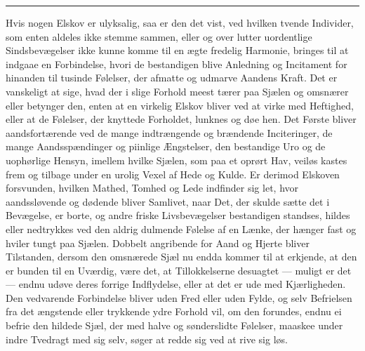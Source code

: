 \documentclass[12pt,a4paper]{book}
\newcommand{\apage}[1]{\marginnote{\footnotesize\textit{[#1]}}}
\begin{document}
\begin{center}\rule{0.28\linewidth}{0.4pt}\end{center}

Hvis nogen Elskov er ulyksalig, saa er den det vist, ved hvilken tvende
Individer, som enten aldeles ikke stemme sammen, eller og over lutter
uordentlige Sindsbevægelser ikke kunne komme til en ægte fredelig
Harmonie, bringes til at indgaae en Forbindelse, hvori de bestandigen
blive Anledning og Incitament for hinanden til tusinde Følelser, der
afmatte og udmarve Aandens Kraft. Det er vanskeligt at sige, hvad der i
slige Forhold meest tærer paa Sjælen og omsnærer eller betynger den,
enten at en virkelig Elskov bliver ved at virke med Heftighed, eller at
de Følelser, der knyttede Forholdet, lunknes og døe hen. Det Første
bliver aandsfortærende ved de mange indtrængende og brændende
Inciteringer, de mange Aandsspændinger og piinlige Ængstelser, den
bestandige Uro og de uophørlige Hensyn, imellem hvilke Sjælen, som paa
et oprørt \apage{133} Hav, veiløs kastes frem og tilbage under en urolig Vexel af
Hede og Kulde. Er derimod Elskoven forsvunden, hvilken Mathed, Tomhed og
Lede indfinder sig let, hvor aandssløvende og dødende bliver Samlivet,
naar Det, der skulde sætte det i Bevægelse, er borte, og andre friske
Livsbevægelser bestandigen standses, hildes eller nedtrykkes ved den
aldrig dulmende Følelse af en Lænke, der hænger fast og hviler tungt paa
Sjælen. Dobbelt angribende for Aand og Hjerte bliver Tilstanden, dersom
den omsnærede Sjæl nu endda kommer til at erkjende, at den er bunden til
en Uværdig, være det, at Tillokkelserne desuagtet --- muligt er det ---
endnu udøve deres forrige Indflydelse, eller at det er ude med
Kjærligheden. Den vedvarende Forbindelse bliver uden Fred eller uden
Fylde, og selv Befrielsen fra det ængstende eller trykkende ydre Forhold
vil, om den forundes, endnu ei befrie den hildede Sjæl, der med halve og
sønderslidte Følelser, maaskee under indre Tvedragt med sig selv, søger
at redde sig ved at rive sig løs.
\end{document}
